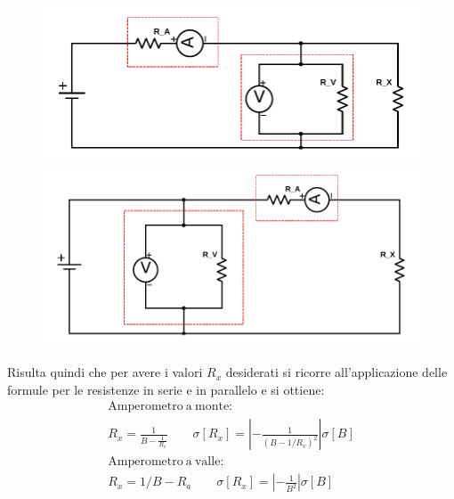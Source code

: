 \documentclass{article}
\begin{document}
\begin{figure}[ht]
	\centering
	 \begin{minipage}{0.5\textwidth}
	     \centering
	     \includegraphics[width=\textwidth]{data/Amperometro_Monte.pdf} 
	 \end{minipage}\hfill
	 \begin{minipage}{0.5\textwidth}
	     \centering
	     \includegraphics[width=\textwidth]{data/Amperometro_Valle.pdf} 
	 \end{minipage}
	 \caption{\label{fig:amp-volt}}
\end{figure}

\newpage

Risulta quindi che per avere i valori $R_x$ desiderati si ricorre all'applicazione delle formule per le resistenze in serie e in parallelo e si ottiene:
\begin{gather}
	\nonumber \mathrm{Amperometro\ a\ monte:} \\
	R_x=\frac{1}{B-\frac{1}{R_v}} \qquad \sigma[R_x]=\left|-\frac{1}{ \left(B-1/R_v\right) ^2 }\right| \sigma[B] \\
	\nonumber \mathrm{Amperometro\ a\ valle:} \\
	R_x=1/B - R_a \qquad \sigma[R_x] = \left|-\frac{1}{ B ^2 }\right| \sigma[B]
\end{gather}
\end{document}
